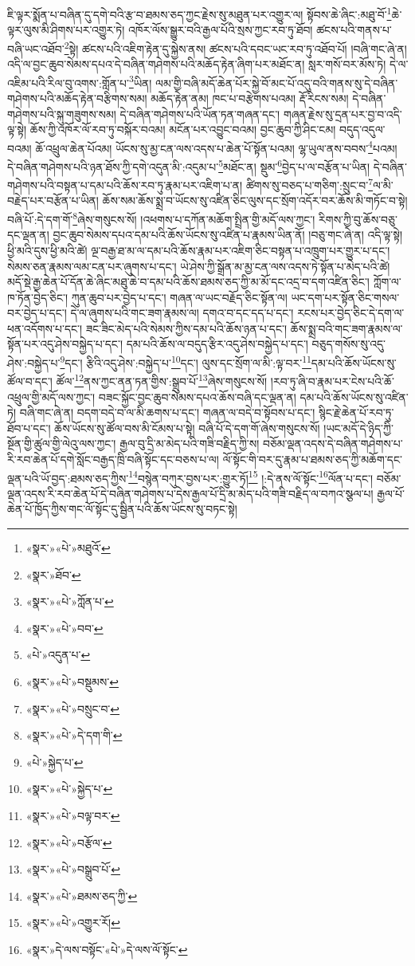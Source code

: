 ཇི་ལྟར་སྨོན་པ་བཞིན་དུ་དགེ་བའི་རྩ་བ་ཐམས་ཅད་ཀྱང་རྗེས་སུ་མཐུན་པར་འགྱུར་ལ། སྟོབས་ཆེ་ཞིང་:མཐུ་བོ་\footnote{«སྣར་»«པེ་»མཐུའོ་}ཆེ་ལྟར་ལུས་མི་ཤིགས་པར་འགྱུར་ཏེ། འཁོར་ལོས་སྒྱུར་བའི་རྒྱལ་པོའི་སྲས་ཀྱང་རབ་ཏུ་ཐོབ། ཚངས་པའི་གནས་པ་བཞི་ཡང་འཐོབ་\footnote{«སྣར་»ཐོབ་}སྟེ། ཚངས་པའི་འཇིག་རྟེན་དུ་སྐྱེས་ནས། ཚངས་པའི་དབང་ཡང་རབ་ཏུ་འཐོབ་པོ། །བཞི་གང་ཞེ་ན། འདི་ལ་བྱང་ཆུབ་སེམས་དཔའ་དེ་བཞིན་གཤེགས་པའི་མཆོད་རྟེན་ཞིག་པར་མཐོང་ན། སླར་གསོ་བར་མོས་ཏེ། དེ་ལ་འཇིམ་པའི་རིལ་བུ་འགས་:གློན་པ་\footnote{«སྣར་»«པེ་»ཀློན་པ་}ཡིན། ལམ་གྱི་བཞི་མདོ་ཆེན་པོར་སྐྱེ་བོ་མང་པོ་འདུ་བའི་གནས་སུ་དེ་བཞིན་གཤེགས་པའི་མཆོད་རྟེན་བརྩིགས་སམ། མཆོད་རྟེན་ནམ། ཁང་པ་བརྩེགས་པའམ། རྡོ་རིངས་སམ། དེ་བཞིན་གཤེགས་པའི་སྐུ་གཟུགས་སམ། དེ་བཞིན་གཤེགས་པའི་ཡོན་ཏན་གཞན་དང་། གཞན་རྗེས་སུ་དྲན་པར་བྱ་བ་འདི་ལྟ་སྟེ། ཆོས་ཀྱི་འཁོར་ལོ་རབ་ཏུ་བསྐོར་བའམ། མངོན་པར་འབྱུང་བའམ། བྱང་ཆུབ་ཀྱི་ཤིང་ངམ། བདུད་འདུལ་བའམ། ཆོ་འཕྲུལ་ཆེན་པོའམ། ཡོངས་སུ་མྱ་ངན་ལས་འདས་པ་ཆེན་པོ་སྟོན་པའམ། ལྷ་ཡུལ་ནས་བབས་\footnote{«སྣར་»«པེ་»བབ་}པའམ། དེ་བཞིན་གཤེགས་པའི་ཉན་ཐོས་ཀྱི་དགེ་འདུན་མི་:འདུམ་པ་\footnote{«པེ་»འདུན་པ་}མཐོང་ན། སྡུམ་\footnote{«སྣར་»«པེ་»བསྡུམས་}བྱེད་པ་ལ་བརྩོན་པ་ཡིན། དེ་བཞིན་གཤེགས་པའི་བསྟན་པ་དམ་པའི་ཆོས་རབ་ཏུ་རྣམ་པར་འཇིག་པ་ན། ཚིགས་སུ་བཅད་པ་གཅིག་:སྲུང་བ་\footnote{«སྣར་»«པེ་»བསྲུང་བ་}ལ་མི་བརྗེད་པར་བརྩོན་པ་ཡིན། ཆོས་སམ་ཆོས་སྨྲ་བ་ཡོངས་སུ་འཛིན་ཅིང་ལུས་དང་སྲོག་འདོར་བར་ཆོས་མི་གཏོང་བ་སྟེ། བཞི་པོ་:དེ་དག་གོ་\footnote{«སྣར་»«པེ་»དེ་དག་གི་}ཞེས་གསུངས་སོ། །འཕགས་པ་དཀོན་མཆོག་སྤྲིན་གྱི་མདོ་ལས་ཀྱང་། རིགས་ཀྱི་བུ་ཆོས་བཅུ་དང་ལྡན་ན། བྱང་ཆུབ་སེམས་དཔའ་དམ་པའི་ཆོས་ཡོངས་སུ་འཛིན་པ་རྣམས་ཡིན་ནོ། །བཅུ་གང་ཞེ་ན། འདི་ལྟ་སྟེ། ཕྱི་མའི་དུས་ཕྱི་མའི་ཚེ། ལྔ་བརྒྱ་ཐ་མ་ལ་དམ་པའི་ཆོས་རྣམ་པར་འཇིག་ཅིང་བསྟན་པ་འཁྲུག་པར་གྱུར་པ་དང་། སེམས་ཅན་རྣམས་ལམ་ངན་པར་ཞུགས་པ་དང་། ཡེ་ཤེས་ཀྱི་སྒྲོན་མ་མྱ་ངན་ལས་འདས་ཏེ་སྟོན་པ་མེད་པའི་ཚེ། མདོ་སྡེ་རྒྱ་ཆེན་པོ་དོན་ཆེ་ཞིང་མཐུ་ཆེ་བ་དམ་པའི་ཆོས་ཐམས་ཅད་ཀྱི་མ་མོ་དང་འདྲ་བ་དག་འཛིན་ཅིང་། ཀློག་ལ་ཁ་ཏོན་བྱེད་ཅིང་། ཀུན་ཆུབ་པར་བྱེད་པ་དང་། གཞན་ལ་ཡང་བརྗོད་ཅིང་སྟོན་ལ། ཡང་དག་པར་སྟོན་ཅིང་གསལ་བར་བྱེད་པ་དང་། དེ་ལ་ཞུགས་པའི་གང་ཟག་རྣམས་ལ། དགའ་བ་དང་དད་པ་དང་། རངས་པར་བྱེད་ཅིང་དེ་དག་ལ་ཕན་འདོགས་པ་དང་། ཟང་ཟིང་མེད་པའི་སེམས་ཀྱིས་དམ་པའི་ཆོས་ཉན་པ་དང་། ཆོས་སྨྲ་བའི་གང་ཟག་རྣམས་ལ་སྟོན་པར་འདུ་ཤེས་བསྐྱེད་པ་དང་། དམ་པའི་ཆོས་ལ་བདུད་རྩིར་འདུ་ཤེས་བསྐྱེད་པ་དང་། བཅུད་གསོས་སུ་འདུ་ཤེས་:བསྐྱེད་པ་\footnote{«པེ་»སྐྱེད་པ་}དང་། རྩིའི་འདུ་ཤེས་:བསྐྱེད་པ་\footnote{«སྣར་»«པེ་»སྐྱེད་པ་}དང་། ལུས་དང་སྲོག་ལ་མི་:ལྟ་བར་\footnote{«སྣར་»«པེ་»བལྟ་བར་}དམ་པའི་ཆོས་ཡོངས་སུ་ཚོལ་བ་དང་། ཚོལ་\footnote{«སྣར་»«པེ་»བརྩོལ་}ནས་ཀྱང་ནན་ཏན་གྱིས་:སྒྲུབ་པོ་\footnote{«སྣར་»«པེ་»བསྒྲུབ་པོ་}ཞེས་གསུངས་སོ། །རབ་ཏུ་ཞི་བ་རྣམ་པར་ངེས་པའི་ཆོ་འཕྲུལ་གྱི་མདོ་ལས་ཀྱང་། བཟང་སྐྱོང་བྱང་ཆུབ་སེམས་དཔའ་ཆོས་བཞི་དང་ལྡན་ན། དམ་པའི་ཆོས་ཡོངས་སུ་འཛིན་ཏེ། བཞི་གང་ཞེ་ན། བདག་བདེ་བ་ལ་མི་ཆགས་པ་དང་། གཞན་ལ་བདེ་བ་སྟོབས་པ་དང་། སྙིང་རྗེ་ཆེན་པོ་རབ་ཏུ་ཐོབ་པ་དང་། ཆོས་ཡོངས་སུ་ཚོལ་བས་མི་ངོམས་པ་སྟེ། བཞི་པོ་དེ་དག་གོ་ཞེས་གསུངས་སོ། །ཡང་མདོ་དེ་ཉིད་ཀྱི་སྔོན་གྱི་ཚུལ་གྱི་ལེའུ་ལས་ཀྱང་། རྒྱལ་བུ་དྲི་མ་མེད་པའི་གཟི་བརྗིད་ཀྱི་ས། བཅོམ་ལྡན་འདས་དེ་བཞིན་གཤེགས་པ་རི་རབ་ཆེན་པོ་དགེ་སློང་བརྒྱད་ཁྲི་བཞི་སྟོང་དང་བཅས་པ་ལ། ལོ་སྟོང་གི་བར་དུ་རྣམ་པ་ཐམས་ཅད་ཀྱི་མཆོག་དང་ལྡན་པའི་ཡོ་བྱད་:ཐམས་ཅད་ཀྱིས་\footnote{«སྣར་»«པེ་»ཐམས་ཅད་ཀྱི་}བསྙེན་བཀུར་བྱས་པར་:གྱུར་ཏོ།\footnote{«སྣར་»«པེ་»འགྱུར་རོ།} །:དེ་ནས་ལོ་སྟོང་\footnote{«སྣར་»དེ་ལས་བསྟོང་«པེ་»དེ་ལས་ལོ་སྟོང་}ལོན་པ་དང་། བཅོམ་ལྡན་འདས་རི་རབ་ཆེན་པོ་དེ་བཞིན་གཤེགས་པ་དེས་རྒྱལ་པོ་དྲི་མ་མེད་པའི་གཟི་བརྗིད་ལ་བཀའ་སྩལ་པ། རྒྱལ་པོ་ཆེན་པོ་ཁྱོད་ཀྱིས་གང་ལོ་སྟོང་དུ་སྦྱིན་པའི་ཆོས་ཡོངས་སུ་བཏང་སྟེ། 